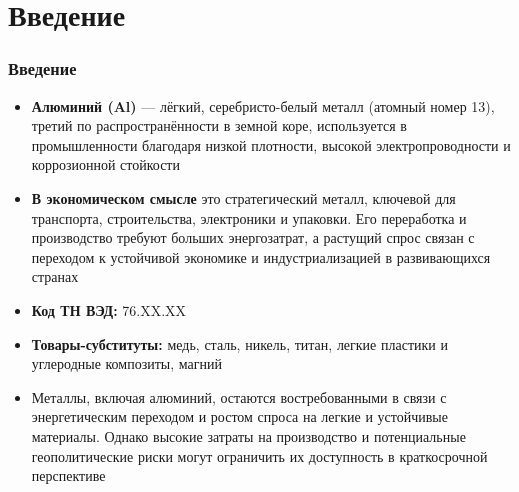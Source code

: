 \section*{Введение}

\begin{frame}
    \frametitle{Введение}
    \begin{center}
          \begin{itemize}
            \item \textbf{Алюминий (Al)} — лёгкий, серебристо-белый металл (атомный номер 13), третий по распространённости в земной коре, используется в промышленности благодаря низкой плотности, высокой электропроводности и коррозионной стойкости
            \item \textbf{В экономическом смысле} это стратегический металл, ключевой для транспорта, строительства, электроники и упаковки. Его переработка и производство требуют больших энергозатрат, а растущий спрос связан с переходом к устойчивой экономике и индустриализацией в развивающихся странах
            \item \textbf{Код ТН ВЭД:} 76.XX.XX
            \item \textbf{Товары-субституты:} медь, сталь, никель, титан, легкие пластики и углеродные композиты, магний
            \item Металлы, включая алюминий, остаются востребованными в связи с энергетическим переходом и ростом спроса на легкие и устойчивые материалы. Однако высокие затраты на производство и потенциальные геополитические риски могут ограничить их доступность в краткосрочной перспективе
          \end{itemize}
    \end{center}
\end{frame}